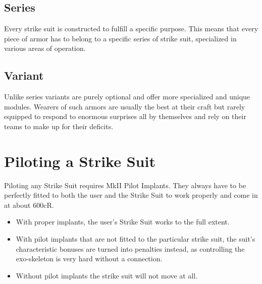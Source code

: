 \documentclass[12pt,a4paper,openany]{book}
\begin{document}
	\section{Series}
	Every strike suit is constructed to fulfill a specific purpose. This means that every piece of armor has to belong to a specific series of strike suit, specialized in various areas of operation.

    \begin{multicols}{2}
    \end{multicols}
    
    \section{Variant}
    Unlike series variants are purely optional and offer more specialized and unique modules. Wearers of such armors are usually the best at their craft but rarely equipped to respond to enormous surprises all by themselves and rely on their teams to make up for their deficits.
    
    \begin{multicols}{2}
    \end{multicols}
    
    \chapter{Piloting a Strike Suit}
    Piloting any Strike Suit requires MkII Pilot Implants. They always have to be perfectly fitted to both the user and the Strike Suit to work properly and come in at about 600cR.\\
    \begin{itemize}
    	\item With proper implants, the user's Strike Suit works to the full extent.
    	\item With pilot implants that are not fitted to the particular strike suit, the suit's characteristic bonuses are turned into penalties instead, as controlling the exo-skeleton is very hard without a connection.
    	\item Without pilot implants the strike suit will not move at all.
    \end{itemize}
    
\end{document}
